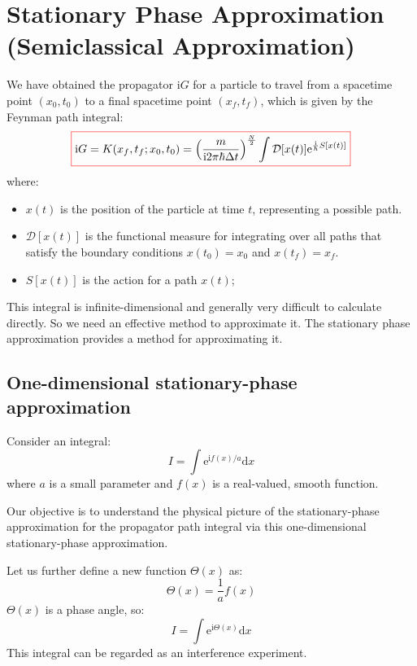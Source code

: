 \chapter{Stationary Phase Approximation (Semiclassical Approximation)}
We have obtained the propagator $\mathrm{i}G$ for a particle to travel from a spacetime point $(x_0, t_0)$ to a final spacetime point $(x_f, t_f)$,
which is given by the Feynman path integral:
\begin{equation}
    \label{eq:path-integral-without-p}
    \colorboxed{
    \mathrm{i}G = K(x_f, t_f; x_0, t_0) 
    =\left( \frac{m}{\mathrm{i} 2\pi\hbar\Delta t} \right)^{\frac{N}{2}} \int \mathcal{D}[x(t)] \mathrm{e}^{\frac{\mathrm{i}}{\hbar} S[x(t)]}
    }
\end{equation}
where:
\begin{itemize}
    \item $x(t)$ is the position of the particle at time $t$, representing a possible path.
    \item $\mathcal{D}[x(t)]$ is the functional measure for integrating over all paths that satisfy the boundary conditions $x(t_0)=x_0$ and $x(t_f)=x_f$.
    \item $S[x(t)]$ is the action for a path $x(t)$;
\end{itemize}
This integral is infinite-dimensional and generally very difficult to calculate directly. So we need an effective method to approximate it.
The stationary phase approximation provides a method for approximating it.

\section{One-dimensional stationary-phase approximation}
Consider an integral:
\begin{equation}
I = \int \mathrm{e}^{\mathrm{i} f(x)/a} \mathrm{d}x
\end{equation}
where $a$ is a small parameter and $f(x)$ is a real-valued, smooth function.

Our objective is to understand the physical picture of the stationary-phase approximation for the propagator path integral via this one-dimensional stationary-phase approximation.

Let us further define a new function $\Theta(x)$ as:
\begin{equation}
\Theta(x) = \frac{1}{a} f(x)
\end{equation}
$\Theta(x)$ is a phase angle, so:
\begin{equation}
I = \int \mathrm{e}^{\mathrm{i}\Theta(x)} \mathrm{d}x
\end{equation}
This integral can be regarded as an interference experiment.

